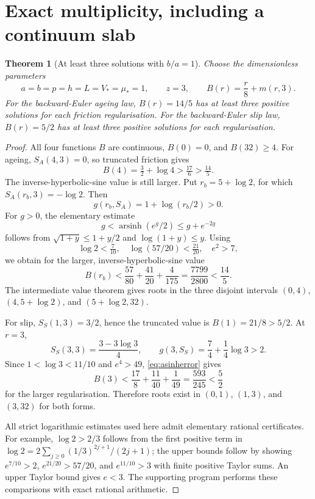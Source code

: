 \documentclass[11pt,a4paper]{article}
\newtheorem{theorem}{Theorem}[section]
\theoremstyle{definition}\newtheorem{definition}[theorem]{Definition}
\theoremstyle{remark}\newtheorem{remark}[theorem]{Remark}
\newcommand{\asinh}{\operatorname{arsinh}}
\numberwithin{equation}{section}
\begin{document}
\section{Exact multiplicity, including a continuum slab}\label{sec:multiplicity}
\begin{theorem}[At least three solutions with $b/a=1$]\label{thm:three}
Choose the dimensionless parameters
\begin{equation}\label{eq:exampleparams}
 a=b=p=h=L=V_*=\mu_*=1,\qquad z=3,
 \qquad B(r)=\frac r8+m(r,3).
\end{equation}
For the backward-Euler ageing law, $B(r)=14/5$ has at least three positive solutions for each friction regularisation. For the backward-Euler slip law, $B(r)=5/2$ has at least three positive solutions for each regularisation.
\end{theorem}
\begin{proof}
All four functions $B$ are continuous, $B(0)=0$, and $B(32)\ge4$.
For ageing, $S_A(4,3)=0$, so truncated friction gives
\[
 B(4)=\tfrac32+\log4>\tfrac{17}{6}>\tfrac{14}{5}.
\]
The inverse-hyperbolic-sine value is still larger. Put $r_b=5+\log2$, for which $S_A(r_b,3)=-\log2$. Then
\[
 g(r_b,S_A)=1+\log(r_b/2)>0.
\]
For $g>0$, the elementary estimate
\begin{equation}\label{eq:asinherror}
 g<\asinh(e^g/2)\le g+e^{-2g}
\end{equation}
follows from $\sqrt{1+y}\le1+y/2$ and $\log(1+y)\le y$. Using
\[
 \log2<\tfrac7{10},\quad \log(57/20)<\tfrac{21}{20},\quad e^2>7,
\]
we obtain for the larger, inverse-hyperbolic-sine value
\[
 B(r_b)<\frac{57}{80}+\frac{41}{20}+\frac4{175}
 =\frac{7799}{2800}<\frac{14}{5}.
\]
The intermediate value theorem gives roots in the three disjoint intervals
$(0,4)$, $(4,5+\log2)$, and $(5+\log2,32)$.

For slip, $S_S(1,3)=3/2$, hence the truncated value is
$B(1)=21/8>5/2$. At $r=3$,
\[
 S_S(3,3)=\frac{3-3\log3}{4},\qquad
 g(3,S_S)=\frac74+\frac14\log3>2.
\]
Since $1<\log3<11/10$ and $e^4>49$, \eqref{eq:asinherror} gives
\[
 B(3)<\frac{17}{8}+\frac{11}{40}+\frac1{49}
 =\frac{593}{245}<\frac52
\]
for the larger regularisation. Therefore roots exist in $(0,1)$, $(1,3)$, and $(3,32)$ for both forms.

All strict logarithmic estimates used here admit elementary rational certificates. For example, $\log2>2/3$ follows from the first positive term in
$\log2=2\sum_{j\ge0}(1/3)^{2j+1}/(2j+1)$; the upper bounds follow by showing $e^{7/10}>2$, $e^{21/20}>57/20$, and $e^{11/10}>3$ with finite positive Taylor sums. An upper Taylor bound gives $e<3$. The supporting program performs these comparisons with exact rational arithmetic.
\end{proof}
\end{document}

